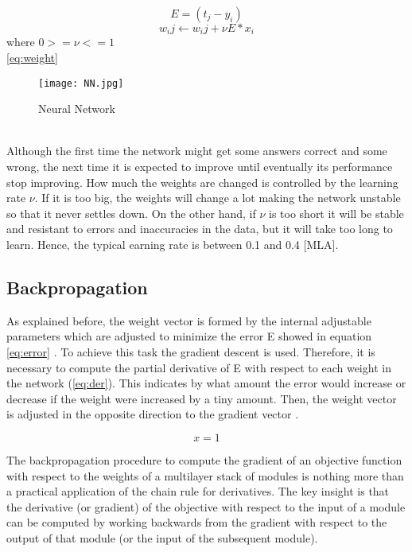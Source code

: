\begin{equation}
\label{eq:error}
E=(t_j - y_i)
\end{equation}
\begin{equation}
\label{eq:weight}
w_ij \leftarrow w_ij+\nu E * x_i
\end{equation} where $0>=\nu<=1$ \\
\ref{eq:weight}
\begin{figure}
\label{fig:nn}
\center
\texttt{[image: NN.jpg]}
\caption{Neural Network}
\end{figure}
\\
Although the first time the network might get some answers correct and some wrong, the next time it is expected to improve until eventually its performance stop improving. How much the weights are changed is controlled by the learning rate $\nu$. If it is too big, the weights will change a lot  making the network unstable so that it never settles down. On the other hand, if $\nu$ is too short it will be stable and resistant to errors and inaccuracies in the data, but it will take too long to learn. Hence, the typical earning rate is between 0.1 and 0.4 [MLA].

\subsection{Backpropagation}

As explained before, the weight vector is formed by the internal adjustable parameters which are adjusted to minimize the error E showed in equation \ref{eq:error}	. To achieve this task the gradient descent is used. Therefore, it is necessary to compute the partial derivative of E with respect to each weight in the network (\ref{eq:der}). This indicates by what amount the error would increase or decrease if the weight were increased by a tiny amount. Then, the weight vector is adjusted in the opposite direction to the gradient vector \cite{lecun2015deep}. 

\begin{equation}
\label{eq:der}
x=1
\end{equation}

The backpropagation procedure to compute the gradient of an objective function with respect to the weights of a multilayer stack of modules is nothing more than a practical application of the chain rule for derivatives. The key insight is that the derivative (or gradient)
of the objective with respect to the input of a module can be computed by working backwards from the gradient with respect to the output of that module (or the input of the subsequent module). \cite{lecun2015deep}

